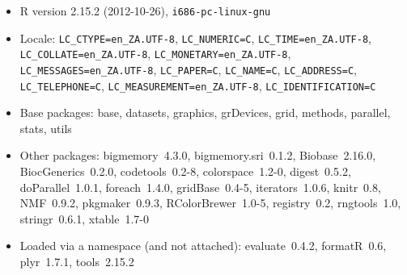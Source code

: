 \documentclass[a4paper]{article}\usepackage{graphicx, color}
\begin{document}
\begin{itemize}\raggedright
  \item R version 2.15.2 (2012-10-26), \verb|i686-pc-linux-gnu|
  \item Locale: \verb|LC_CTYPE=en_ZA.UTF-8|, \verb|LC_NUMERIC=C|, \verb|LC_TIME=en_ZA.UTF-8|, \verb|LC_COLLATE=en_ZA.UTF-8|, \verb|LC_MONETARY=en_ZA.UTF-8|, \verb|LC_MESSAGES=en_ZA.UTF-8|, \verb|LC_PAPER=C|, \verb|LC_NAME=C|, \verb|LC_ADDRESS=C|, \verb|LC_TELEPHONE=C|, \verb|LC_MEASUREMENT=en_ZA.UTF-8|, \verb|LC_IDENTIFICATION=C|
  \item Base packages: base, datasets, graphics,
    grDevices, grid, methods, parallel, stats, utils
  \item Other packages: bigmemory~4.3.0,
    bigmemory.sri~0.1.2, Biobase~2.16.0,
    BiocGenerics~0.2.0, codetools~0.2-8,
    colorspace~1.2-0, digest~0.5.2, doParallel~1.0.1,
    foreach~1.4.0, gridBase~0.4-5, iterators~1.0.6,
    knitr~0.8, NMF~0.9.2, pkgmaker~0.9.3,
    RColorBrewer~1.0-5, registry~0.2, rngtools~1.0,
    stringr~0.6.1, xtable~1.7-0
  \item Loaded via a namespace (and not attached):
    evaluate~0.4.2, formatR~0.6, plyr~1.7.1,
    tools~2.15.2
\end{itemize}




\printbibliography[heading=bibintoc]
\end{document}
